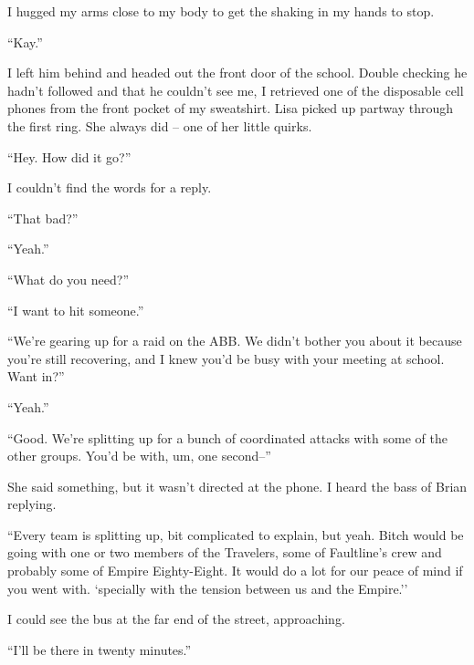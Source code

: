 I hugged my arms close to my body to get the shaking in my hands to stop.



``Kay.''



I left him behind and headed out the front door of the school.  Double checking he hadn't followed and that he couldn't see me, I retrieved one of the disposable cell phones from the front pocket of my sweatshirt.  Lisa picked up partway through the first ring.  She always did – one of her little quirks.



``Hey.  How did it go?''



I couldn't find the words for a reply.



``That bad?''



``Yeah.''



``What do you need?''



``I want to hit someone.''



``We're gearing up for a raid on the ABB.  We didn't bother you about it because you're still recovering, and I knew you'd be busy with your meeting at school.  Want in?''



``Yeah.''



``Good.  We're splitting up for a bunch of coordinated attacks with some of the other groups.  You'd be with, um, one second--''



She said something, but it wasn't directed at the phone.  I heard the bass of Brian replying.



``Every team is splitting up, bit complicated to explain, but yeah.  Bitch would be going with one or two members of the Travelers, some of Faultline's crew and probably some of Empire Eighty-Eight.  It would do a lot for our peace of mind if you went with.  `specially with the tension between us and the Empire.''



I could see the bus at the far end of the street, approaching.



``I'll be there in twenty minutes.''





